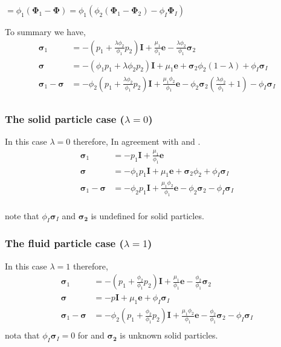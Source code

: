 $
= \phi_1 (\mathbf{\Phi}_1 - \mathbf{\Phi})
= \phi_1 ( \phi_2 (\mathbf{\Phi}_1  -  \mathbf{\Phi}_2)  - \phi_I \mathbf{\Phi}_I )$


To summary we have, 
\begin{align*}
    \bm{\sigma}_1 
    &= - \left(p_1 + \frac{\lambda \phi_2}{\phi_1} p_2\right) \textbf{I}
    + \frac{\mu_1}{\phi_1} \textbf{e}
    - \frac{\lambda \phi_2}{\phi_1} \bm{\sigma}_2 \\
    \bm{\sigma}
    &= - (\phi_1 p_1 + \lambda \phi_2 p_2) \textbf{I}
    + \mu_1 \textbf{e}
    + \bm{\sigma}_2 \phi_2 (1 - \lambda)
    +\phi_I \bm{\sigma}_I \\
    \bm{\sigma}_1 - \bm{\sigma}
    &=- \phi_2 \left(p_1 + \frac{\lambda \phi_2}{\phi_1} p_2\right) \textbf{I}
    + \frac{\mu_1\phi_2}{\phi_1} \textbf{e}
    - \phi_2\bm{\sigma}_2 \left(
        \frac{\lambda \phi_2}{\phi_1} + 1
    \right)
    - \phi_I \bm{\sigma}_I\\
\end{align*}

\subsubsection{The solid particle case ($\lambda = 0$)}
In this case $\lambda = 0$ therefore, 
In agreement with \citet{jackson1997locally} and \citet{zhang1997momentum}. 
\begin{align*}
    \bm{\sigma}_1 
    &= - p_1  \textbf{I}
    + \frac{\mu_1}{\phi_1} \textbf{e}\\
    \bm{\sigma}
    &= - \phi_1 p_1 \textbf{I}
    + \mu_1 \textbf{e}
    + \bm{\sigma}_2 \phi_2 
    +\phi_I \bm{\sigma}_I \\
    \bm{\sigma}_1 - \bm{\sigma}
    &=- \phi_2 p_1  \textbf{I}
    + \frac{\mu_1\phi_2}{\phi_1} \textbf{e}
    - \phi_2\bm{\sigma}_2 
    - \phi_I \bm{\sigma}_I\\
\end{align*}

note that $\phi_I \bm{\sigma}_I$ and $\bm{\sigma_2}$ is undefined for solid particles. 

\subsubsection{The fluid particle case ($\lambda = 1$)}
In this case $\lambda = 1$ therefore, 
\begin{align*}
    \bm{\sigma}_1 
    &= - \left(p_1 + \frac{\phi_2}{\phi_1} p_2\right) \textbf{I}
    + \frac{\mu_1}{\phi_1} \textbf{e}
    - \frac{\phi_2}{\phi_1} \bm{\sigma}_2 \\
    \bm{\sigma}
    &= - p \textbf{I}
    + \mu_1 \textbf{e}
    +\phi_I \bm{\sigma}_I \\
    \bm{\sigma}_1 - \bm{\sigma}
    &=- \phi_2 \left(p_1 + \frac{\phi_2}{\phi_1} p_2\right) \textbf{I}
    + \frac{\mu_1\phi_2}{\phi_1} \textbf{e}
    - \frac{\phi_2}{\phi_1}\bm{\sigma}_2 
    - \phi_I \bm{\sigma}_I\\
\end{align*}
nota that $\phi_I \bm{\sigma}_I = 0$ for and $\bm{\sigma_2}$ is unknown solid particles. 

